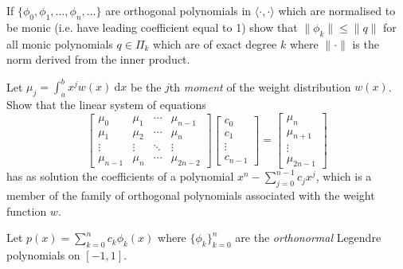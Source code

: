 \documentclass[answers]{exam}
\begin{document}
\begin{questions}
\question%
If $\{\phi_{0}, \phi_{1}, \ldots, \phi_{n}, ...\}$ are orthogonal polynomials in $\langle\cdot, \cdot\rangle$ which are normalised to be monic (i.e. have leading coefficient equal to 1) show that $\|\phi_{k}\| \leq\|q\|$ for all monic polynomials $q \in \Pi_{k}$ which are of exact degree $k$ where $\|\cdot\|$ is the norm derived from the inner product.



\question%
Let $\mu_{j}=\int_{a}^{b} x^{j} w(x)~ \mathrm{d} x$ be the $j$th \emph{moment} of the weight distribution $w(x)$. Show that the linear system of equations \[
	\begin{bmatrix}
		\mu_{0} & \mu_{1} & \cdots & \mu_{n-1} \\
		\mu_{1} & \mu_{2} & \cdots & \mu_{n} \\
		\vdots & \vdots & \ddots & \vdots \\
		\mu_{n-1} & \mu_{n} & \cdots & \mu_{2 n-2}
	\end{bmatrix}\begin{bmatrix}
		c_{0} \\
		c_{1} \\
		\vdots \\
		c_{n-1}
	\end{bmatrix}=\begin{bmatrix}
		\mu_{n} \\
		\mu_{n+1} \\
		\vdots \\
		\mu_{2 n-1}
	\end{bmatrix}
\] has as solution the coefficients of a polynomial $x^{n}-\sum_{j=0}^{n-1} c_{j} x^{j}$, which is a member of the family of orthogonal polynomials associated with the weight function $w$.



\question%
Let $p(x)=\sum_{k=0}^{n} c_{k} \phi_{k}(x)$ where $\{\phi_{k}\}_{k=0}^{n}$ are the \emph{orthonormal} Legendre polynomials on $[-1,1]$.




\end{questions}
\end{document}
